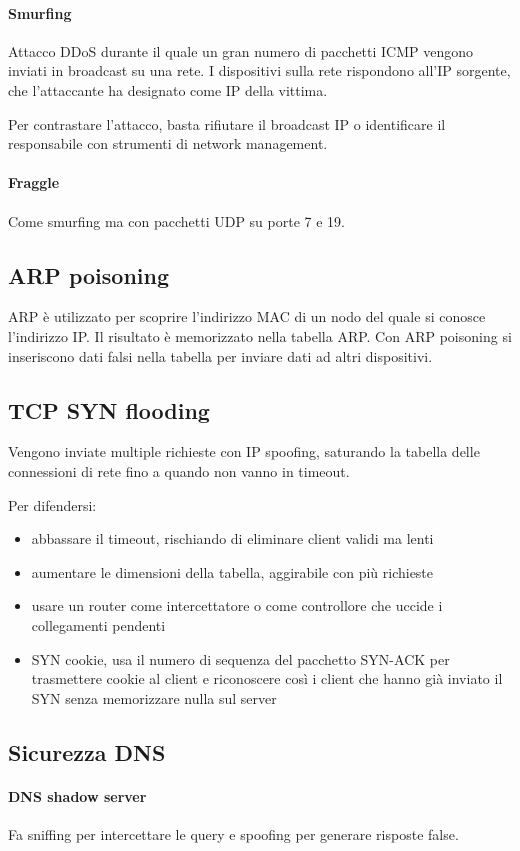 \documentclass[11pt]{article}
\begin{document}
\paragraph*{Smurfing}
Attacco DDoS durante il quale un gran numero di pacchetti ICMP vengono inviati in broadcast su una rete. I dispositivi 
sulla rete rispondono all'IP sorgente, che l'attaccante ha designato come IP della vittima.

Per contrastare l'attacco, basta rifiutare il broadcast IP o identificare il responsabile con strumenti di network management.
\paragraph*{Fraggle}
Come smurfing ma con pacchetti UDP su porte 7 e 19.
\subsection{ARP poisoning}
ARP è utilizzato per scoprire l'indirizzo MAC di un nodo del quale si conosce l'indirizzo IP. Il risultato è memorizzato 
nella tabella ARP. Con ARP poisoning si inseriscono dati falsi nella tabella per inviare dati ad altri dispositivi.
\subsection{TCP SYN flooding}
Vengono inviate multiple richieste con IP spoofing, saturando la tabella delle connessioni di rete fino a quando non vanno
in timeout.

Per difendersi:
\begin{itemize}
    \item abbassare il timeout, rischiando di eliminare client validi ma lenti
    \item aumentare le dimensioni della tabella, aggirabile con più richieste 
    \item usare un router come intercettatore o come controllore che uccide i collegamenti pendenti
    \item SYN cookie, usa il numero di sequenza del pacchetto SYN-ACK per trasmettere cookie al client e riconoscere così 
    i client che hanno già inviato il SYN senza memorizzare nulla sul server
\end{itemize}
\subsection{Sicurezza DNS}
\paragraph*{DNS shadow server}
Fa sniffing per intercettare le query e spoofing per generare risposte false.
\end{document}
